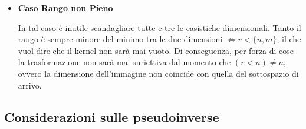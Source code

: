 \begin{itemize}
\begin{itemize}
\end{itemize}

\item{\textbf{Caso Rango non Pieno}}

In tal caso è inutile scandagliare tutte e tre le casistiche dimensionali. Tanto il rango è sempre minore del minimo tra le due dimensioni $\iff r<\{n,m\}$, il che vuol dire che il kernel non sarà mai vuoto. Di conseguenza, per forza di cose la trasformazione non sarà mai suriettiva dal momento che $(r<n)\neq n$, ovvero la dimensione dell'immagine non coincide con quella del sottospazio di arrivo.

\end{itemize}

\subsection{Considerazioni sulle pseudoinverse}

